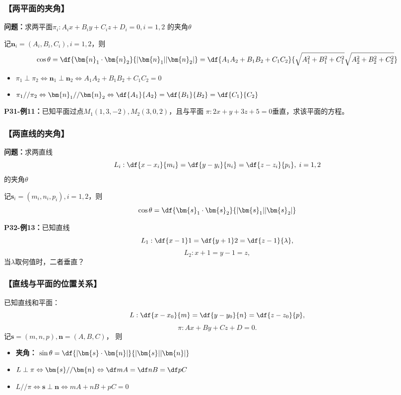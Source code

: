 \subsubsection{【两平面的夹角】}

{\bf 问题：}求两平面$\pi_i:A_ix+B_iy+C_iz+D_i=0,i=1,2$
的夹角$\theta$

记$\bm{n}_i=(A_i,B_i,C_i),i=1,2$，则
$$\cos\theta=\df{\bm{n}_1\cdot\bm{n}_2}{|\bm{n}_1||\bm{n}_2|}
=\df{A_1A_2+B_1B_2+C_1C_2}{\sqrt{A_1^2+B_1^2+C_1^2}
\sqrt{A_2^2+B_2^2+C_2^2}}$$

\begin{itemize}
  \item $\pi_1\perp\pi_2 \Leftrightarrow\bm{n}_1\perp\bm{n}_2 
	  \Leftrightarrow A_1A_2+B_1B_2+C_1C_2=0$
  \item $\pi_1//\pi_2 \Leftrightarrow\bm{n}_1//\bm{n}_2 
	  \Leftrightarrow\df{A_1}{A_2}=\df{B_1}{B_2}=\df{C_1}{C_2}$
\end{itemize}

{\bf P31-例11：}已知平面过点$M_1(1,3,-2),M_2(3,0,2)$，且与平面
$\pi:2x+y+3z+5=0$垂直，求该平面的方程。

\subsubsection{【两直线的夹角】}

{\bf 问题：}求两直线
$$L_i:\df{x-x_i}{m_i}=\df{y-y_i}{n_i}=\df{z-z_i}{p_i},\;i=1,2$$
的夹角$\theta$ 

记$\bm{s}_i=(m_i,n_i,p_i),i=1,2$，则
$${\cos\theta=\df{\bm{s}_1\cdot\bm{s}_2}{|\bm{s}_1||\bm{s}_2|}}$$

{\bf P32-例13：}已知直线
$$L_1:\df{x-1}1=\df{y+1}2=\df{z-1}{\lambda},$$
$$L_2:x+1=y-1=z,$$
当$\lambda$取何值时，二者垂直？

\subsubsection{【直线与平面的位置关系】}

已知直线和平面：
$$L:\df{x-x_0}{m}=\df{y-y_0}{n}=\df{z-z_0}{p},$$
$$\pi:Ax+By+Cz+D=0.$$ 
记$\bm{s}=(m,n,p),\bm{n}=(A,B,C)$， 则
\begin{itemize}
  \item {\bf 夹角：}
  $\sin\theta=\df{|\bm{s}\cdot\bm{n}|}{|\bm{s}||\bm{n}|}$ 
  \item $L\perp\pi \Leftrightarrow\bm{s}//\bm{n} 
  \Leftrightarrow \df mA=\df nB=\df pC$ 
  \item $L//\pi \Leftrightarrow\bm{s}\perp\bm{n} 
  \Leftrightarrow mA+nB+pC=0$
\end{itemize}

